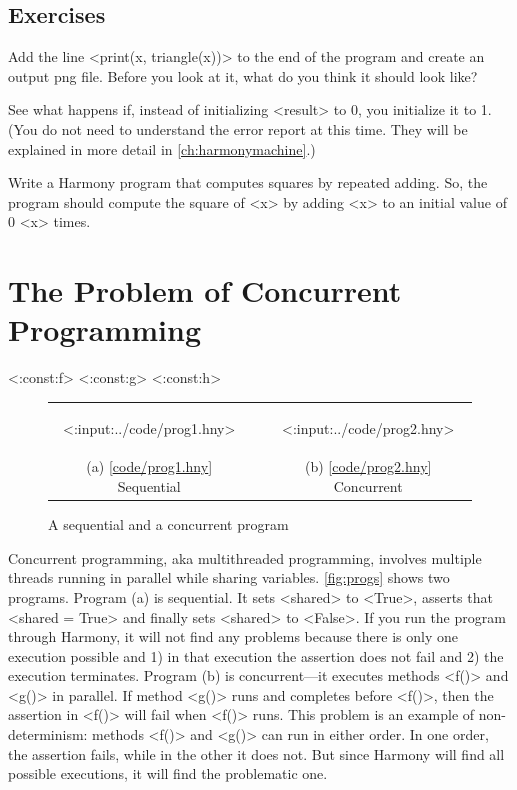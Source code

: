 \documentclass{report}
\newcommand{\harmonylink}[1]{%
[\href{https://harmony.cs.cornell.edu/#1}{\underline{#1}}]%
}
\begin{document}
\section*{Exercises}
\begin{problems}
\item Add the line <{print(x, triangle(x))}> to the end of the
program and create an output png file.  Before you look at it, what
do you think it should look like?
\item See what happens if, instead of initializing <{result}> to 0,
you initialize it to 1.  (You do not need to understand the error report at this time.  They will be explained in more detail in \autoref{ch:harmonymachine}.)
\item Write a Harmony program that computes squares by repeated adding.  So, the program
should compute the square of <{x}> by adding <{x}> to an initial value of 0 <{x}> times.
\end{problems}

\chapter{The Problem of Concurrent Programming}
\label{ch:concurrent}

<{:const:f}>
<{:const:g}>
<{:const:h}>

\begin{figure}[h]
\begin{center}
\begin{tabular}{ccc}
\begin{tcolorbox}[width=0.4\linewidth]
<{:input:../code/prog1.hny}>
\end{tcolorbox}
& \rule{0.05\linewidth}{0in} &
\begin{tcolorbox}[width=0.4\linewidth]
<{:input:../code/prog2.hny}>
\end{tcolorbox}
\\
(a) \harmonylink{code/prog1.hny} Sequential && (b) \harmonylink{code/prog2.hny} Concurrent
\end{tabular}
\end{center}
\caption{A sequential and a concurrent program}
\label{fig:progs}
\end{figure}

%

Concurrent programming, aka multithreaded programming, involves multiple
threads
%
running in parallel while sharing variables.
\autoref{fig:progs} shows two programs.  Program (a) is sequential.
It sets <{shared}> to <{True}>, asserts that
<{shared = True}> and finally sets <{shared}> to <{False}>.
If you run the program through Harmony, it will not find any problems
because there is only one execution possible and 1) in that execution
the assertion does not fail and 2) the execution terminates.
Program (b) is concurrent---it executes methods <{f()}> and
<{g()}> in parallel.
If method <{g()}> runs and completes before <{f()}>, then
the assertion in <{f()}> will fail when <{f()}> runs.
This problem is an example of non-determinism: methods <{f()}>
and <{g()}> can run in either order.
In one order, the assertion fails, while in the other it does not.
But since Harmony will find all possible executions, it will find
the problematic one.
\end{document}
